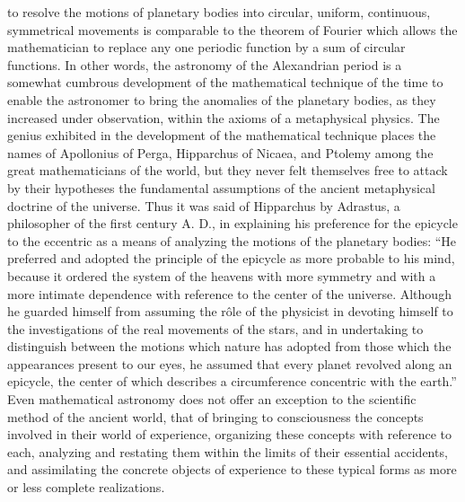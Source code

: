 \documentclass[12pt]{article}
\begin{document}
to resolve the motions of planetary bodies into
circular, uniform, continuous, symmetrical movements
is comparable to the theorem of Fourier which allows
the mathematician to replace any one periodic function
by a sum of circular functions. In other words,
the astronomy of the Alexandrian period is a somewhat
cumbrous development of the mathematical technique
of the time to enable the astronomer to bring the anomalies
of the planetary bodies, as they increased under
observation, within the axioms of a metaphysical
physics. The genius exhibited in the development of
the mathematical technique places the names of Apollonius
of Perga, Hipparchus of Nicaea, and Ptolemy
among the great mathematicians of the world, but they
never felt themselves free to attack by their hypotheses
the fundamental assumptions of the ancient metaphysical
doctrine of the universe. Thus it was said of
Hipparchus by Adrastus, a philosopher of the first
century A. D., in explaining his preference for the
epicycle to the eccentric as a means of analyzing the
motions of the planetary bodies: ``He preferred and
adopted the principle of the epicycle as more probable
to his mind, because it ordered the system of the
heavens with more symmetry and with a more intimate
dependence with reference to the center of the universe.
Although he guarded himself from assuming the rôle
of the physicist in devoting himself to the investigations
of the real movements of the stars, and in undertaking
to distinguish between the motions which nature has
adopted from those which the appearances present to
our eyes, he assumed that every planet revolved along
an epicycle, the center of which describes a circumference
concentric with the earth.'' Even mathematical
astronomy does not offer an exception to the scientific
method of the ancient world, that of bringing to
consciousness the concepts involved in their world
of experience, organizing these concepts with reference
to each, analyzing and restating them within
the limits of their essential accidents, and assimilating
the concrete objects of experience to these typical
forms as more or less complete realizations.
\end{document}
